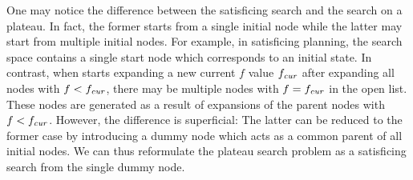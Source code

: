 


% 
% 


One may notice the difference between the satisficing search and the search on a plateau.
In fact, the former starts from a single initial node while the latter may start from multiple initial nodes.
For example, in satisficing planning, the search space contains a single start node which corresponds to an initial state.
% 
In contrast, when \astar starts expanding a new current $f$ value $f_{\mit{cur}}$ after expanding all nodes with $f<f_\mit{cur}$,
there may be multiple nodes with $f=f_\mit{cur}$ in the open list.
These nodes are generated as a result of expansions of the parent nodes with $f<f_\mit{cur}$.
% 
However, the difference is superficial: The latter can be reduced to the former case by introducing a dummy node
which acts as a common parent of all initial nodes. We can thus reformulate the plateau search problem as a satisficing search from the single dummy node.


